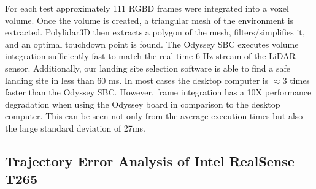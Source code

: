 For each test approximately 111 \ac{RGBD} frames were integrated into a voxel volume.  Once the volume is created, a triangular mesh of the environment is extracted.  Polylidar3D then extracts a polygon of the mesh, filters/simplifies it, and an optimal touchdown point is found. The Odyssey \ac{SBC} executes volume integration sufficiently fast to match the real-time 6 Hz stream of the LiDAR sensor. Additionally, our landing site selection software is able to find a safe landing site in less than 60 ms. In most cases the desktop computer is $\approx3$ times faster than the Odyssey \ac{SBC}. However, frame integration has a 10X performance degradation when using the Odyssey board in comparison to the desktop computer.  This can be seen not only from the average execution times but also the large standard deviation of 27ms. 

\begin{table}[H]
\centering
\caption{Mean and standard deviation of execution times (ms)}\label{table:ch7_execution_time}
\end{table}


\subsection{Trajectory Error Analysis of Intel RealSense T265}\label{sec:ch7_results_t265_accuracy}


